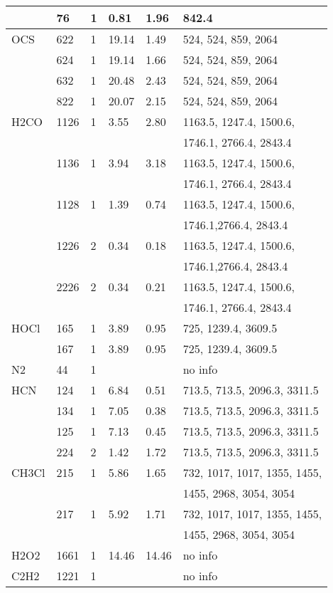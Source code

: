 \begin{longtable}{llllll}
     & 76& 1& 0.81& 1.96& 842.4\\
\hline
  OCS& 622& 1& 19.14& 1.49& 524, 524, 859, 2064\\
     & 624& 1& 19.14& 1.66& 524, 524, 859, 2064\\
     & 632& 1& 20.48& 2.43& 524, 524, 859, 2064\\
     & 822& 1& 20.07& 2.15& 524, 524, 859, 2064\\
\hline
  H2CO& 1126& 1& 3.55& 2.80& 1163.5, 1247.4, 1500.6, \\
      &     &  &     &     & 1746.1, 2766.4, 2843.4\\
      & 1136& 1& 3.94& 3.18& 1163.5, 1247.4, 1500.6, \\
      &     &  &     &     & 1746.1, 2766.4, 2843.4 \\
      & 1128& 1& 1.39& 0.74& 1163.5, 1247.4, 1500.6,\\
      &     &  &     &     & 1746.1,2766.4, 2843.4\\
      & 1226& 2& 0.34& 0.18& 1163.5, 1247.4, 1500.6,\\
      &     &  &     &     & 1746.1,2766.4, 2843.4\\
      & 2226& 2& 0.34& 0.21& 1163.5, 1247.4, 1500.6,\\
      &     &  &     &     & 1746.1, 2766.4, 2843.4\\
\hline
  HOCl& 165& 1& 3.89& 0.95& 725, 1239.4, 3609.5\\
      & 167& 1& 3.89& 0.95& 725, 1239.4, 3609.5\\
\hline
  N2& 44& 1& & & no info\\
\hline
  HCN& 124& 1& 6.84& 0.51& 713.5, 713.5, 2096.3, 3311.5\\
     & 134& 1& 7.05& 0.38& 713.5, 713.5, 2096.3, 3311.5\\
     & 125& 1& 7.13& 0.45& 713.5, 713.5, 2096.3, 3311.5\\
     & 224& 2& 1.42& 1.72& 713.5, 713.5, 2096.3, 3311.5\\
\hline
  CH3Cl& 215& 1& 5.86& 1.65& 732, 1017, 1017, 1355, 1455,\\
       &    &  &     &     & 1455, 2968, 3054, 3054\\
       & 217& 1& 5.92& 1.71& 732, 1017, 1017, 1355, 1455,\\
       &    &  &     &     & 1455, 2968, 3054, 3054\\
\hline
  H2O2& 1661& 1& 14.46& 14.46& no info\\
\hline
  C2H2& 1221& 1& & & no info\\

\end{longtable}
